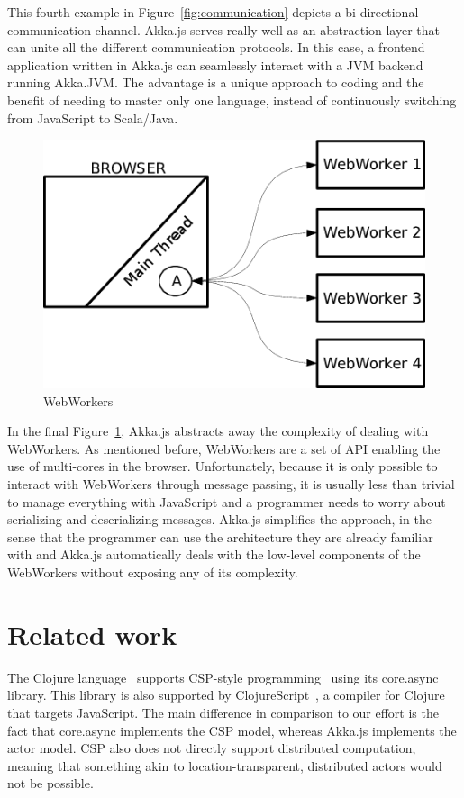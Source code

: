 \documentclass{sig-alternate}
\begin{document}
This fourth example in Figure~\ref{fig:communication} depicts a bi-directional communication channel. Akka.js serves really well as an abstraction layer
that can unite all the different communication protocols. In this case, a frontend application written in Akka.js
can seamlessly interact with a JVM backend running Akka.JVM. The advantage is a unique approach to coding and
the benefit of needing to master only one language, instead of continuously switching from JavaScript to Scala/Java.

\begin{figure}
\centering
\includegraphics[scale=0.3]{5.png}
\caption{WebWorkers}
\label{fig:ww}
\end{figure}

In the final Figure~\ref{fig:ww}, Akka.js abstracts away the complexity of dealing with WebWorkers. As mentioned before, WebWorkers are a set of API enabling the use of multi-cores in the browser. Unfortunately, because it is only possible to interact with WebWorkers through message passing, it is usually less than trivial to manage everything with JavaScript and a programmer needs to worry about serializing and deserializing messages. Akka.js simplifies the approach, in the sense that the programmer can use the architecture they are already familiar with and Akka.js automatically deals with the low-level components of the WebWorkers without exposing any of its complexity.


\section{Related work}\label{sec:related}

The Clojure language~\cite{Halloway09} supports CSP-style programming~\cite{Hoare78} using its
core.async library. This library is also supported by
ClojureScript~\cite{ClojureScript}, a compiler for Clojure that targets
JavaScript. The main difference in comparison to our effort is the fact that core.async implements the CSP model, whereas Akka.js implements the actor model. CSP also does not directly support distributed computation, meaning that something akin to location-transparent, distributed actors would not be possible.
\end{document}
